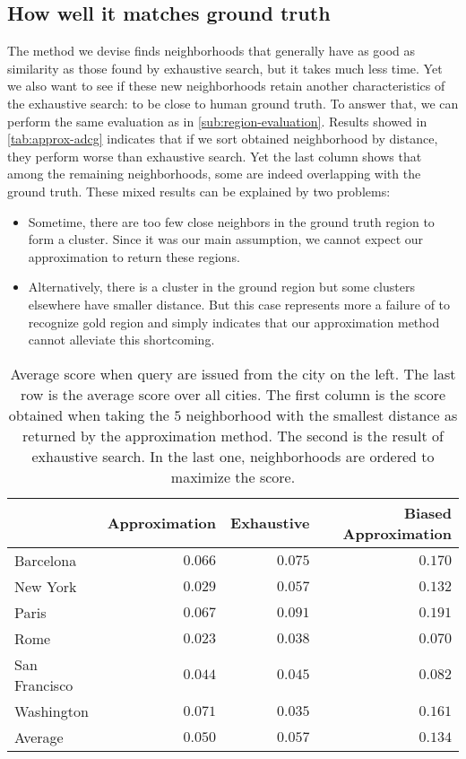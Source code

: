 \fi
\subsection{How well it matches ground truth}

The method we devise finds neighborhoods that generally have as good as
similarity as those found by exhaustive search, but it takes much less time.
Yet we also want to see if these new neighborhoods retain another
characteristics of the exhaustive search: to be close to human ground
truth. To answer that, we can perform the same evaluation as in
\autoref{sub:region-evaluation}. Results showed in \autoref{tab:approx-adcg}
indicates that if we sort obtained neighborhood by \emd{} distance, they
perform worse than exhaustive search. Yet the last column shows that among
the remaining neighborhoods, some are indeed overlapping with the ground truth.
These mixed results can be explained by two problems:
\begin{itemize}
	\item Sometime, there are too few close neighbors in the ground truth
		region to form a cluster. Since it was our main assumption, we cannot
		expect our approximation to return these regions.
	\item Alternatively, there is a cluster in the ground region but some
		clusters elsewhere have smaller \emd{} distance. But this case
		represents more a failure of \emd{} to recognize gold region and simply
		indicates that our approximation method cannot alleviate this
		shortcoming.
\end{itemize}

\begin{table}[t]
	\centering
	\begin{tabular}{lrrr}
		\toprule
		              & Approximation & Exhaustive & Biased Approximation \\
		\midrule
		Barcelona     & $0.066$       & $0.075$       & $0.170$ \\
		New York      & $0.029$       & $0.057$       & $0.132$ \\
		Paris         & $0.067$       & $0.091$       & $0.191$ \\
		Rome          & $0.023$       & $0.038$       & $0.070$ \\
		San Francisco & $0.044$       & $0.045$       & $0.082$ \\
		Washington    & $0.071$       & $0.035$       & $0.161$ \\
		\midrule
		Average       & $0.050$       & $0.057$       & $0.134$ \\
		\bottomrule
	\end{tabular}
	\caption[Approximation ability to recover ground truth]{Average score when
		query are issued from the city on the left. The last row is the average
		score over all cities. The first column is the score obtained when
		taking the $5$ neighborhood with the smallest distance as returned by
		the approximation method. The second is the result of exhaustive
		search.  In the last one, neighborhoods are ordered to maximize the
		score. \label{tab:approx-adcg}}
\end{table}
